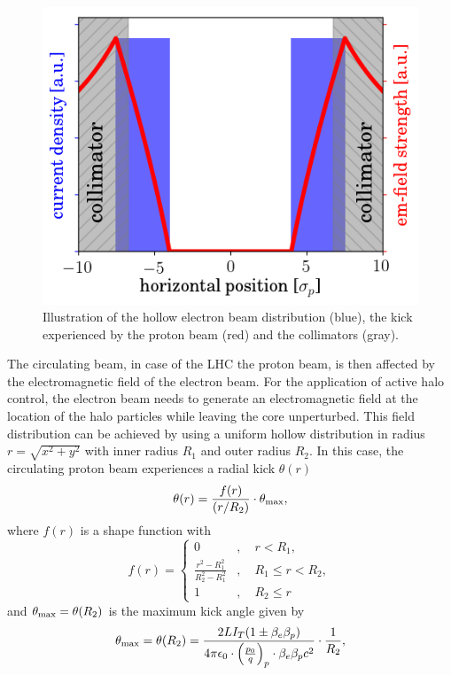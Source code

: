 \documentclass[%
 reprint,
 amsmath,amssymb,
 aps,
prstab,
]{revtex4-1}
\begin{document}
\begin{figure}[b]
	\includegraphics[width=0.8\linewidth]{kick_hel_lhc_no_grid}%
	\caption{\label{fig:hel_field} Illustration of the hollow electron beam distribution (blue), the kick experienced by the proton beam (red) and the collimators (gray).}
\end{figure}
The circulating beam, in case of the LHC the proton beam, is then affected by the electromagnetic field of the electron beam. For the application of active halo control, the electron beam needs to generate an electromagnetic field at the location of the halo particles while leaving the core unperturbed. This field distribution can be achieved by using a uniform hollow distribution in radius $r=\sqrt{x^2+y^2}$ with inner radius $R_1$ and outer radius $R_2$. In this case, the circulating proton beam experiences a radial kick $\theta(r)$
\begin{equation}\label{eq:field_1}
\theta(r)=\frac{f(r)}{(r/R_2)}\cdot \theta_{\rm max},
\end{equation}
where $f(r)$ is a shape function with
\begin{equation}\label{eq:field_2}
f(r) =
\begin{cases} 0 &,\quad r< R_1,\\
\frac{r^2-R_1^2}{R_2^2-R_1^2} &,\quad R_1 \leq r < R_2,\\
1 &,\quad R_2 \leq r
\end{cases}
\end{equation}
and $\theta_{\rm max}=\theta(R_2)$ is the maximum kick angle given by
\begin{equation}\label{hel_kick_max}
\theta_{\rm max} = \theta(R_2) = \frac{2LI_T(1\pm\beta_e\beta_p)}{4\pi\epsilon_0  \cdot \left(\frac{p_0}{q}\right)_p \cdot \beta_e\beta_p c^2}\cdot\frac{1}{R_2},
\end{equation}
\end{document}
